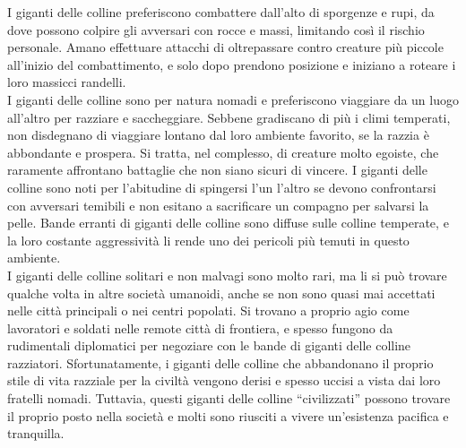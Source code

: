\begin{multicols}{2}
I giganti delle colline preferiscono combattere dall'alto di sporgenze e rupi, da dove possono colpire gli avversari con rocce e massi, limitando così il rischio personale. Amano effettuare attacchi di oltrepassare contro creature più piccole all'inizio del combattimento, e solo dopo prendono posizione e iniziano a roteare i loro massicci randelli.\\
I giganti delle colline sono per natura nomadi e preferiscono viaggiare da un luogo all'altro per razziare e saccheggiare. Sebbene gradiscano di più i climi temperati, non disdegnano di viaggiare lontano dal loro ambiente favorito, se la razzia è abbondante e prospera. Si tratta, nel complesso, di creature molto egoiste, che raramente affrontano battaglie che non siano sicuri di vincere. I giganti delle colline sono noti per l'abitudine di spingersi l'un l'altro se devono confrontarsi con avversari temibili e non esitano a sacrificare un compagno per salvarsi la pelle. Bande erranti di giganti delle colline sono diffuse sulle colline temperate, e la loro costante aggressività li rende uno dei pericoli più temuti in questo ambiente.\\

I giganti delle colline solitari e non malvagi sono molto rari, ma li si può trovare qualche volta in altre società umanoidi, anche se non sono quasi mai accettati nelle città principali o nei centri popolati. Si trovano a proprio agio come lavoratori e soldati nelle remote città di frontiera, e spesso fungono da rudimentali diplomatici per negoziare con le bande di giganti delle colline razziatori. Sfortunatamente, i giganti delle colline che abbandonano il proprio stile di vita razziale per la civiltà vengono derisi e spesso uccisi a vista dai loro fratelli nomadi. Tuttavia, questi giganti delle colline “civilizzati” possono trovare il proprio posto nella società e molti sono riusciti a vivere un'esistenza pacifica e tranquilla.\\


\end{multicols}
